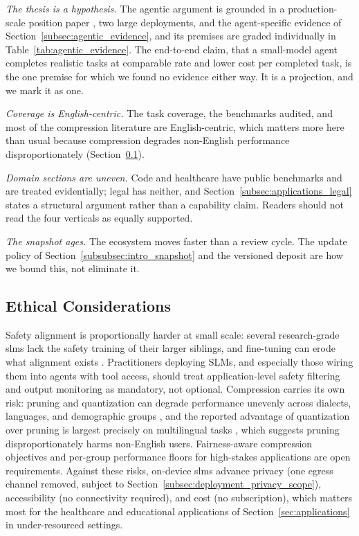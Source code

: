 \emph{The thesis is a hypothesis.} The agentic argument is grounded in a
production-scale position paper \citep{belcak2025slm_agentic}, two large
deployments, and the agent-specific evidence of
Section~\ref{subsec:agentic_evidence}, and its premises are graded individually in
Table~\ref{tab:agentic_evidence}. The end-to-end claim, that a small-model agent
completes realistic tasks at comparable rate and lower cost per completed task,
is the one premise for which we found no evidence either way. It is a projection,
and we mark it as one.

\emph{Coverage is English-centric.} The task coverage, the benchmarks audited, and
most of the compression literature are English-centric, which matters more here
than usual because compression degrades non-English performance disproportionately
(Section~\ref{subsec:discussion_ethics}).

\emph{Domain sections are uneven.} Code and healthcare have public benchmarks and
are treated evidentially; legal has neither, and
Section~\ref{subsec:applications_legal} states a structural argument rather than a
capability claim. Readers should not read the four verticals as equally supported.

\emph{The snapshot ages.} The ecosystem moves faster than a review cycle. The
update policy of Section~\ref{subsubsec:intro_snapshot} and the versioned deposit
are how we bound this, not eliminate it.

\subsection{Ethical Considerations}
\label{subsec:discussion_ethics}

Safety alignment is proportionally harder at small scale: several research-grade
\glspl{slm} lack the safety training of their larger siblings, and fine-tuning can erode
what alignment exists \citep{qi2023finetuning}. Practitioners deploying SLMs, and
especially those wiring them into agents with tool access, should treat
application-level safety filtering and output monitoring as mandatory, not
optional. Compression carries its own risk: pruning and quantization can degrade
performance unevenly across dialects, languages, and demographic groups
\citep{blodgett2020language}, and the reported advantage of quantization over
pruning is largest precisely on multilingual tasks \citep{kurz2025pruning_vs_quant},
which suggests pruning disproportionately harms non-English users. Fairness-aware
compression objectives and per-group performance floors for high-stakes
applications are open requirements. Against these risks, on-device \glspl{slm} advance
privacy (one egress channel removed, subject to Section~\ref{subsec:deployment_privacy_scope}), accessibility (no connectivity required),
and cost (no subscription), which matters most for the healthcare and
educational applications of Section~\ref{sec:applications} in under-resourced
settings.
